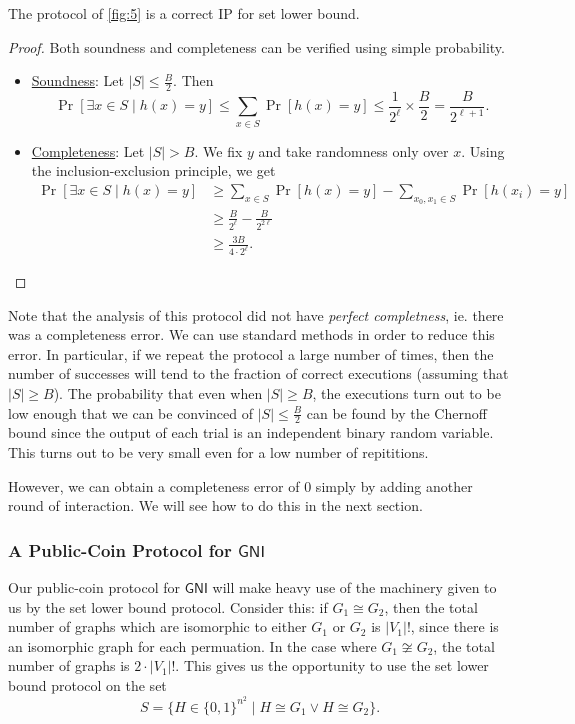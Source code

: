 \begin{theorem}
	The protocol of \ref{fig:5} is a correct IP for set lower bound.
\end{theorem}
\begin{proof}
	Both soundness and completeness can be verified using simple probability. 
	\begin{itemize}
		\item\underline{Soundness}: Let $|S|\leq\frac{B}{2}$. Then $$\Pr[\exists x\in S\mid h(x)=y]\leq\sum_{x\in S}\Pr[h(x)=y]\leq\frac{1}{2^{\ell}}\times\frac{B}{2}=\frac{B}{2^{\ell+1}}.$$
		\item\underline{Completeness}: Let $|S|>B$. We fix $y$ and take randomness only over $x$. Using the inclusion-exclusion principle, we get
		\begin{align*}
		\Pr[\exists x\in S\mid h(x)=y]&\geq \sum_{x\in S}\Pr[h(x)=y]-\sum_{x_0,x_1\in S}\Pr[h(x_i)=y]\\&\geq\frac{B}{2^{\ell}}-\frac{B}{2^{2\ell}}\\&\geq \frac{3B}{4\cdot 2^\ell}.
		\end{align*}
	\end{itemize}
\end{proof}

Note that the analysis of this protocol did not have \textit{perfect completness}, ie. there was a completeness error. We can use standard methods in order to reduce this error. In particular, if we repeat the protocol a large number of times, then the number of successes will tend to the fraction of correct executions (assuming that $|S|\geq B$). The probability that even when $|S|\geq B$, the executions turn out to be low enough that we can be convinced of $|S|\leq\frac{B}{2}$ can be found by the Chernoff bound since the output of each trial is an independent binary random variable. This turns out to be very small even for a low number of repititions.

However, we can obtain a completeness error of $0$ simply by adding another round of interaction. We will see how to do this in the next section.

\subsubsection{A Public-Coin Protocol for $\mathsf{GNI}$}

Our public-coin protocol for $\mathsf{GNI}$ will make heavy use of the machinery given to us by the set lower bound protocol. Consider this: if $G_1\cong G_2$, then the total number of graphs which are isomorphic to either $G_1$ or $G_2$ is $|V_1|!$, since there is an isomorphic graph for each permuation. In the case where $G_1\not\cong G_2$, the total number of graphs is $2\cdot |V_1|!$. This gives us the opportunity to use the set lower bound protocol on the set
$$S=\{H\in\{0,1\}^{n^2}\mid H\cong G_1 \vee H\cong G_2\}.$$

